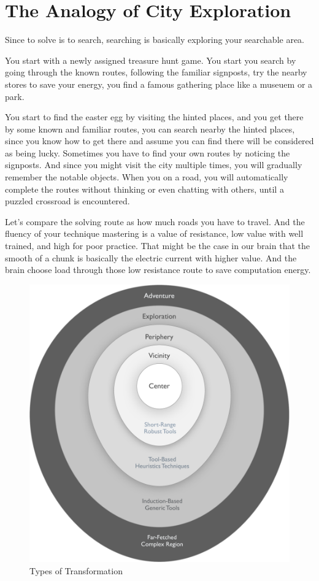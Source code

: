 \section{The Analogy of City Exploration}

Since to solve is to search, searching is basically exploring your searchable area.

You start with a newly assigned treasure hunt game. You start you search by going through the known routes, following the familiar signposts, try the nearby stores to save your energy, you find a famous gathering place like a museuem or a park.

You start to find the easter egg by visiting the hinted places, and you get there by some known and familiar routes, you can search nearby the hinted places, since you know how to get there and assume you can find there will be considered as being lucky. Sometimes you have to find your own routes by noticing the signposts. And since you might visit the city multiple times, you will gradually remember the notable objects. When you on a road, you will automatically complete the routes without thinking or even chatting with others, until a puzzled crossroad is encountered.

Let's compare the solving route as how much roads you have to travel. And the fluency of your technique mastering is a value of resistance, low value with well trained, and high for poor practice. That might be the case in our brain that the smooth of a chunk is basically the electric current with higher value. And the brain choose load through those low resistance route to save computation energy.

\begin{figure}
  \centerline{\includegraphics[width=1.2\linewidth]{img/range.pdf}}
  \caption{Types of Transformation}
  \label{fig:range}
\end{figure}

